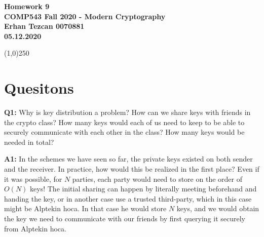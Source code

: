 \documentclass[12pt,reqno]{amsart}
\newcommand{\code}[1]{\texttt{#1}}
\begin{document}
\begin{center}
\large\textbf{Homework 9 \\ COMP543 Fall 2020 - Modern Cryptography \\}
\normalsize\textbf{ Erhan Tezcan 0070881 \\ 05.12.2020} \\
\end{center}

\begin{center}
\line(1,0){250}
\end{center}

%
%

%
%
\section{Quesitons}
\textbf{Q1:} Why is key distribution a problem? How can we share keys with friends in the crypto class? How many keys would each of us need to keep to be able to securely communicate with each other in the class? How many keys would be needed in total?

\textbf{A1:} In the schemes we have seen so far, the private keys existed on both sender and the receiver. In practice, how would this be realized in the first place? Even if it was possible, for $N$ parties, each party would need to store on the order of $O(N)$ keys! The initial sharing can happen by literally meeting beforehand and handing the key, or in another case use a trusted third-party, which in this case might be Alptekin hoca. In that case he would store $N$ keys, and we would obtain the key we need to communicate with our friends by first querying it securely from Alptekin hoca.
\end{document}
